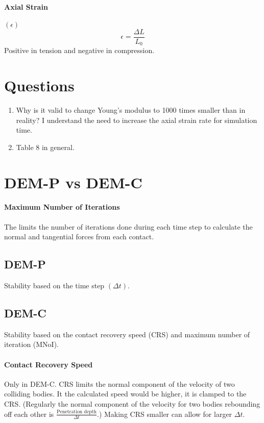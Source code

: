 \documentclass{book}
\begin{document}
\paragraph{Axial Strain} $(\epsilon)$
\begin{equation}
	\epsilon = \frac{\Delta L}{L_0}
\end{equation}
Positive in tension and negative in compression.
\section{Questions}
\begin{enumerate}
	\item Why is it valid to change Young's modulus to 1000 times smaller than in reality? I understand the need to increase the axial strain rate for simulation time.
	\item Table 8 in general.
\end{enumerate}


\section{DEM-P vs DEM-C}
\paragraph{Maximum Number of Iterations} The limits the number of iterations done during each time step to calculate the normal and tangential forces from each contact.
\subsection{DEM-P}
Stability based on the time step $(\Delta t)$.
\subsection{DEM-C}
Stability based on the contact recovery speed (CRS) and maximum number of iteration (MNoI).
\paragraph{Contact Recovery Speed} Only in DEM-C. CRS limits the normal component of the velocity of two colliding bodies. It the calculated speed would be higher, it is clamped to the CRS. (Regularly the normal component of the velocity for two bodies rebounding off each other is $\frac{\text{Penetration depth}}{\Delta t}$.) Making CRS smaller can allow for larger $\Delta t$.
\end{document}
